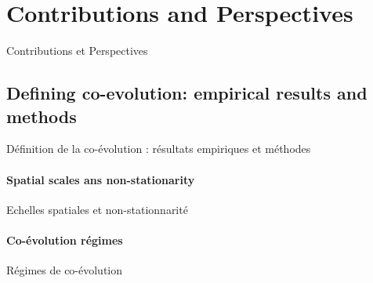 




\newpage


\section{Contributions and Perspectives}{Contributions et Perspectives}

\label{sec:contributions}




\subsection{Defining co-evolution: empirical results and methods}{Définition de la co-évolution : résultats empiriques et méthodes}



\paragraph{Spatial scales ans non-stationarity}{Echelles spatiales et non-stationnarité}






\paragraph{Co-évolution régimes}{Régimes de co-évolution}





